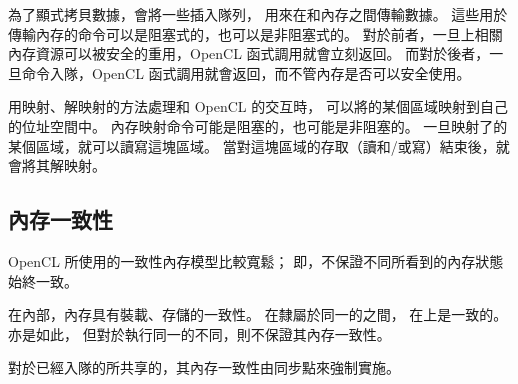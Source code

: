 為了顯式拷貝數據，會將一些插入隊列，
用來在和內存之間傳輸數據。
這些用於傳輸內存的命令可以是阻塞式的，也可以是非阻塞式的。
對於前者，一旦上相關內存資源可以被安全的重用，OpenCL 函式調用就會立刻返回。
而對於後者，一旦命令入隊，OpenCL 函式調用就會返回，而不管內存是否可以安全使用。

用映射、解映射的方法處理和 OpenCL 的交互時，
可以將的某個區域映射到自己的位址空間中。
內存映射命令可能是阻塞的，也可能是非阻塞的。
一旦映射了的某個區域，就可以讀寫這塊區域。
當對這塊區域的存取（讀和/或寫）結束後，就會將其解映射。

\subsection{內存一致性}
OpenCL 所使用的一致性內存模型比較寬鬆；
即，不保證不同所看到的內存狀態始終一致。

在內部，內存具有裝載、存儲的一致性。
在隸屬於同一的之間，
在上是一致的。
亦是如此，
但對於執行同一的不同，則不保證其內存一致性。

對於已經入隊的所共享的，其內存一致性由同步點來強制實施。

